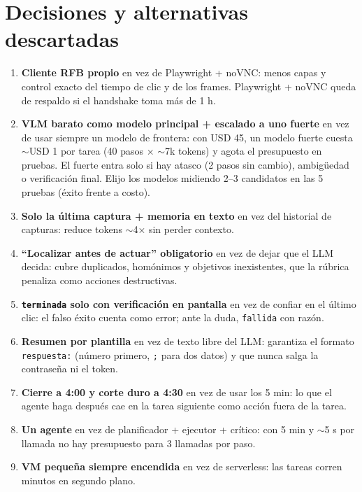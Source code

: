 \documentclass[10pt]{extarticle}
\newcommand{\cod}[1]{\texttt{\footnotesize #1}}
\begin{document}
\section{Decisiones y alternativas descartadas}
\begin{enumerate}
\item \textbf{Cliente RFB propio} en vez de Playwright + noVNC: menos capas y control exacto del tiempo de clic y de los frames. Playwright + noVNC queda de respaldo si el handshake toma más de 1 h.
\item \textbf{VLM barato como modelo principal + escalado a uno fuerte} en vez de usar siempre un modelo de frontera: con USD 45, un modelo fuerte cuesta $\sim$USD 1 por tarea (40 pasos × $\sim$7k tokens) y agota el presupuesto en pruebas. El fuerte entra solo si hay atasco (2 pasos sin cambio), ambigüedad o verificación final. Elijo los modelos midiendo 2--3 candidatos en las 5 pruebas (éxito frente a costo).
\item \textbf{Solo la última captura + memoria en texto} en vez del historial de capturas: reduce tokens $\sim$4× sin perder contexto.
\item \textbf{``Localizar antes de actuar'' obligatorio} en vez de dejar que el LLM decida: cubre duplicados, homónimos y objetivos inexistentes, que la rúbrica penaliza como acciones destructivas.
\item \textbf{\cod{terminada} solo con verificación en pantalla} en vez de confiar en el último clic: el falso éxito cuenta como error; ante la duda, \cod{fallida} con razón.
\item \textbf{Resumen por plantilla} en vez de texto libre del LLM: garantiza el formato \cod{respuesta:} (número primero, \cod{;} para dos datos) y que nunca salga la contraseña ni el token.
\item \textbf{Cierre a 4:00 y corte duro a 4:30} en vez de usar los 5 min: lo que el agente haga después cae en la tarea siguiente como acción fuera de la tarea.
\item \textbf{Un agente} en vez de planificador + ejecutor + crítico: con 5 min y $\sim$5 s por llamada no hay presupuesto para 3 llamadas por paso.
\item \textbf{VM pequeña siempre encendida} en vez de serverless: las tareas corren minutos en segundo plano.
\end{enumerate}
\end{document}
